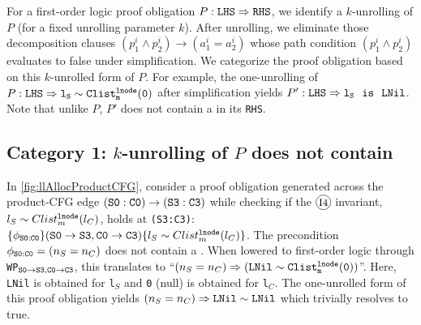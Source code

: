 For a first-order
logic proof obligation
$P: {\tt LHS}\Rightarrow{\tt RHS}$, we identify
a $k$-unrolling of $P$ (for a fixed unrolling parameter $k$).
After unrolling,
we eliminate those decomposition clauses
$(p^i_1\land{}p^i_2)\rightarrow{}(a^i_1=a^i_2)$ whose
path condition $(p^i_1\land{}p^i_2)$ evaluates to false
under simplification.
We categorize the proof obligation based
on this $k$-unrolled form of $P$.
For example, the one-unrolling
of $P: {\tt LHS}\Rightarrow{}{\tt l_S\sim{}Clist^{{\tt lnode}}_{m}(0)}$
after simplification yields
$P': {\tt LHS}\Rightarrow{}{\tt l_S\ \ is\ \ LNil}$.
Note that unlike $P$, $P'$ does not contain a \recursiveRelation{} in its {\tt RHS}.

\subsection[Handling Category 1 Proof Obligations]{Category 1: $k$-unrolling of $P$ does not contain \recursiveRelations{}}
\label{sec:cat1}
In \cref{fig:llAllocProductCFG}, consider a proof obligation generated
across the product-CFG edge ${\tt (S0:C0) \rightarrow (S3:C3)}$
while checking if the ${\small \circled{I4}}$ invariant, $l_{S}\sim{}Clist^{{\tt lnode}}_{m}(l_{C})$,
holds at {\tt (S3:C3)}:
$\{\phi_{{\tt S0:C0}}\} ({\tt S0\rightarrow S3}, {\tt C0\rightarrow C3}) \{l_{S}\sim{}Clist^{{\tt lnode}}_{m}(l_{C})\}$.
The precondition $\phi_{{\tt S0:C0}}=(n_S=n_C)$ does not contain
a \recursiveRelation{}.
When lowered to first-order logic through {\tt WP$_{{\tt S0\rightarrow S3},{\tt C0\rightarrow C3}}$}, this translates to
``$(n_S=n_C)\Rightarrow({\tt LNil}\sim{}{\tt Clist^{{\tt lnode}}_{m}(0)})$''.
Here, {\tt LNil} is obtained for {\tt l$_{S}$} and {\tt 0} (null) is
obtained for {\tt l$_C$}.
The one-unrolled form of this proof obligation yields
$(n_S=n_C)\Rightarrow{}{\tt LNil}\sim{}{\tt LNil}$ which trivially resolves to true.

